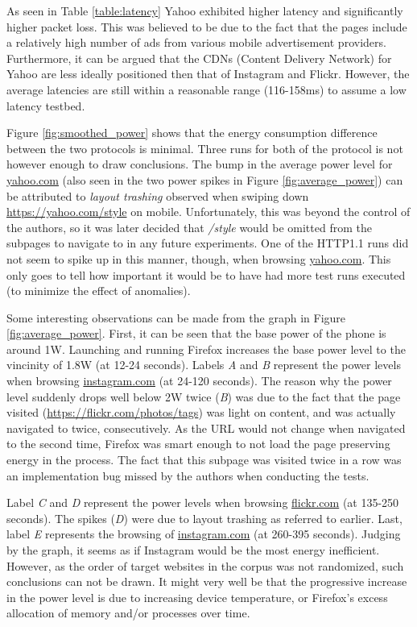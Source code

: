 \documentclass{article}
\begin{document}
As seen in Table \ref{table:latency} Yahoo exhibited higher latency and significantly higher packet loss. This was believed to be due to the fact that the pages include a relatively high number of ads from various mobile advertisement providers. Furthermore, it can be argued that the CDNs (Content Delivery Network) for Yahoo are less ideally positioned then that of Instagram and Flickr. However, the average latencies are still within a reasonable range (116-158ms) to assume a low latency testbed.

Figure \ref{fig:smoothed_power} shows that the energy consumption difference between the two protocols is minimal. Three runs for both of the protocol is not however enough to draw conclusions. The bump in the average power level for \url{yahoo.com} (also seen in the two power spikes in Figure \ref{fig:average_power}) can be attributed to \emph{layout trashing} observed when swiping down \url{https://yahoo.com/style} on mobile. Unfortunately, this was beyond the control of the authors, so it was later decided that \emph{/style} would be omitted from the subpages to navigate to in any future experiments. One of the HTTP1.1 runs did not seem to spike up in this manner, though, when browsing \url{yahoo.com}. This only goes to tell how important it would be to have had more test runs executed (to minimize the effect of anomalies).

Some interesting observations can be made from the graph in Figure \ref{fig:average_power}. First, it can be seen that the base power of the phone is around 1W. Launching and running Firefox increases the base power level to the vincinity of 1.8W (at 12-24 seconds). Labels \emph{A}  and \emph{B} represent the power levels when browsing \url{instagram.com} (at 24-120 seconds). The reason why the power level suddenly drops well below 2W twice (\emph{B}) was due to the fact that the page visited (\url{https://flickr.com/photos/tags}) was light on content, and was actually navigated to twice, consecutively. As the URL would not change when navigated to the second time, Firefox was smart enough to not load the page preserving energy in the process. The fact that this subpage was visited twice in a row was an implementation bug missed by the authors when conducting the tests.

Label \emph{C} and \emph{D} represent the power levels when browsing \url{flickr.com} (at 135-250 seconds). The spikes (\emph{D}) were due to layout trashing as referred to earlier. Last, label \emph{E} represents the browsing of \url{instagram.com} (at 260-395 seconds). Judging by the graph, it seems as if Instagram would be the most energy inefficient. However, as the order of target websites in the corpus was not randomized, such conclusions can not be drawn. It might very well be that the progressive increase in the power level is due to increasing device temperature, or Firefox's excess allocation of memory and/or processes over time.
\end{document}

